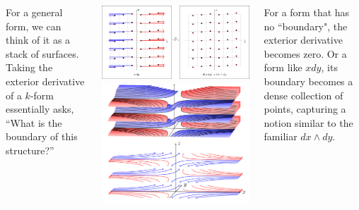 \documentclass[20pt,margin=1in,innermargin=-4.5in,blockverticalspace=-0.25in]{tikzposter}
\begin{document}
\begin{columns}
{        For a general form, we can think of it as a stack of surfaces. Taking the exterior derivative of a \( k \)-form essentially asks, “What is the boundary of this structure?” 
        \begin{center}
            \includegraphics[scale=0.5]{exteriorderivative.png}
            \qquad
            \includegraphics[scale=1]{d of xydz.png}
        \end{center}

        For a form that has no ``boundary", the exterior derivative becomes zero. Or a form like \( x dy \), its boundary becomes a dense collection of points, capturing a notion similar to the familiar \( dx \wedge dy \).
        }
        

\end{columns}
\end{document}
